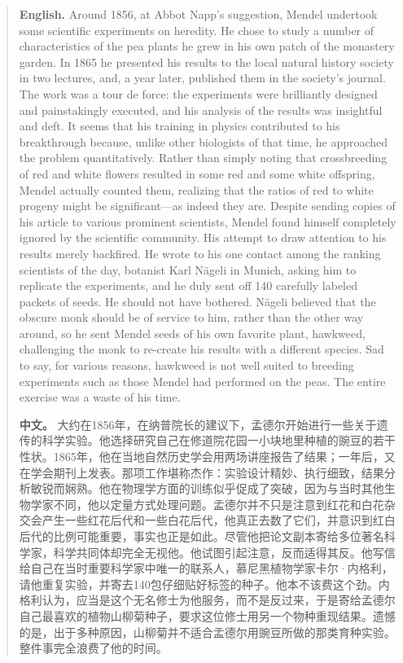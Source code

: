 \begin{quote}
\noindent\textbf{English.} Around 1856, at Abbot Napp's suggestion, Mendel undertook some scientific experiments on heredity. He chose to study a number of characteristics of the pea plants he grew in his own patch of the monastery garden. In 1865 he presented his results to the local natural history society in two lectures, and, a year later, published them in the society's journal. The work was a tour de force: the experiments were brilliantly designed and painstakingly executed, and his analysis of the results was insightful and deft. It seems that his training in physics contributed to his breakthrough because, unlike other biologists of that time, he approached the problem quantitatively. Rather than simply noting that crossbreeding of red and white flowers resulted in some red and some white offspring, Mendel actually counted them, realizing that the ratios of red to white progeny might be significant---as indeed they are. Despite sending copies of his article to various prominent scientists, Mendel found himself completely ignored by the scientific community. His attempt to draw attention to his results merely backfired. He wrote to his one contact among the ranking scientists of the day, botanist Karl Nägeli in Munich, asking him to replicate the experiments, and he duly sent off 140 carefully labeled packets of seeds. He should not have bothered. Nägeli believed that the obscure monk should be of service to him, rather than the other way around, so he sent Mendel seeds of his own favorite plant, hawkweed, challenging the monk to re-create his results with a different species. Sad to say, for various reasons, hawkweed is not well suited to breeding experiments such as those Mendel had performed on the peas. The entire exercise was a waste of his time.

\smallskip
\noindent\textbf{中文。} 大约在1856年，在纳普院长的建议下，孟德尔开始进行一些关于遗传的科学实验。他选择研究自己在修道院花园一小块地里种植的豌豆的若干性状。1865年，他在当地自然历史学会用两场讲座报告了结果；一年后，又在学会期刊上发表。那项工作堪称杰作：实验设计精妙、执行细致，结果分析敏锐而娴熟。他在物理学方面的训练似乎促成了突破，因为与当时其他生物学家不同，他以定量方式处理问题。孟德尔并不只是注意到红花和白花杂交会产生一些红花后代和一些白花后代，他真正去数了它们，并意识到红白后代的比例可能重要，事实也正是如此。尽管他把论文副本寄给多位著名科学家，科学共同体却完全无视他。他试图引起注意，反而适得其反。他写信给自己在当时重要科学家中唯一的联系人，慕尼黑植物学家卡尔·内格利，请他重复实验，并寄去140包仔细贴好标签的种子。他本不该费这个劲。内格利认为，应当是这个无名修士为他服务，而不是反过来，于是寄给孟德尔自己最喜欢的植物山柳菊种子，要求这位修士用另一个物种重现结果。遗憾的是，出于多种原因，山柳菊并不适合孟德尔用豌豆所做的那类育种实验。整件事完全浪费了他的时间。
\end{quote}


